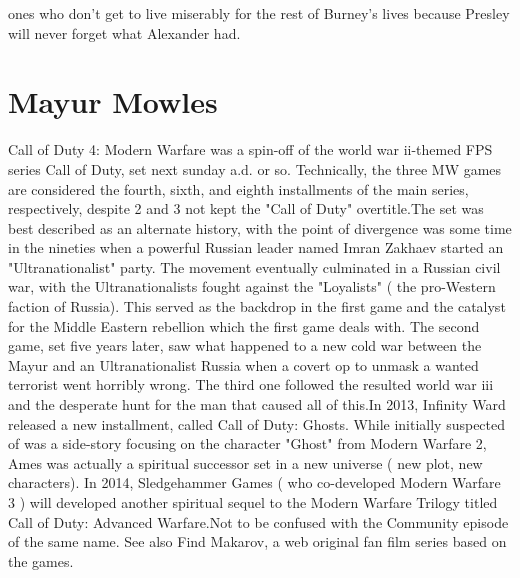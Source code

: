 \documentclass[12pt]{book}
\begin{document}
ones who don't get to live miserably for the rest of Burney's lives because Presley will never forget what Alexander had.



\chapter{Mayur Mowles}

Call of Duty 4: Modern Warfare was a spin-off of the world war ii-themed FPS series Call of Duty, set next sunday a.d. or so. Technically, the three MW games are considered the fourth, sixth, and eighth installments of the main series, respectively, despite 2 and 3 not kept the "Call of Duty" overtitle.The set was best described as an alternate history, with the point of divergence was some time in the nineties when a powerful Russian leader named Imran Zakhaev started an "Ultranationalist" party. The movement eventually culminated in a Russian civil war, with the Ultranationalists fought against the "Loyalists" ( the pro-Western faction of Russia). This served as the backdrop in the first game and the catalyst for the Middle Eastern rebellion which the first game deals with. The second game, set five years later, saw what happened to a new cold war between the Mayur and an Ultranationalist Russia when a covert op to unmask a wanted terrorist went horribly wrong. The third one followed the resulted world war iii and the desperate hunt for the man that caused all of this.In 2013, Infinity Ward released a new installment, called Call of Duty: Ghosts. While initially suspected of was a side-story focusing on the character "Ghost" from Modern Warfare 2, Ames was actually a spiritual successor set in a new universe ( new plot, new characters). In 2014, Sledgehammer Games ( who co-developed Modern Warfare 3 ) will developed another spiritual sequel to the Modern Warfare Trilogy titled Call of Duty: Advanced Warfare.Not to be confused with the Community episode of the same name. See also Find Makarov, a web original fan film series based on the games.
\end{document}
